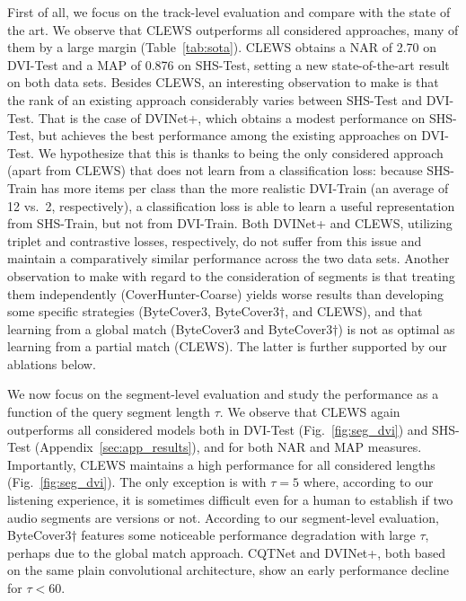 First of all, we focus on the track-level evaluation and compare with the state of the art. We observe that CLEWS outperforms all considered approaches, many of them by a large margin (Table~\ref{tab:sota}). CLEWS obtains a NAR of 2.70 on DVI-Test and a MAP of 0.876 on SHS-Test, setting a new state-of-the-art result on both data sets. Besides CLEWS, an interesting observation to make is that the rank of an existing approach considerably varies between SHS-Test and DVI-Test. That is the case of DVINet+, which obtains a modest performance on SHS-Test, but achieves the best performance among the existing approaches on DVI-Test. We hypothesize that this is thanks to being the only considered approach (apart from CLEWS) that does not learn from a classification loss: because SHS-Train has more items per class than the more realistic DVI-Train (an average of 12 vs.\ 2, respectively), a classification loss is able to learn a useful representation from SHS-Train, but not from DVI-Train. Both DVINet+ and CLEWS, utilizing triplet and contrastive losses, respectively, do not suffer from this issue and maintain a comparatively similar performance across the two data sets. 
Another observation to make with regard to the consideration of segments is that treating them independently (CoverHunter-Coarse) yields worse results than developing some specific strategies (ByteCover3, ByteCover3$\dag$, and CLEWS), and that learning from a global match (ByteCover3 and ByteCover3$\dag$) is not as optimal as learning from a partial match (CLEWS). The latter is further supported by our ablations below.


We now focus on the segment-level evaluation and study the performance as a function of the query segment length $\tau$. We observe that CLEWS again outperforms all considered models both in DVI-Test (Fig.~\ref{fig:seg_dvi}) and SHS-Test (Appendix~\ref{sec:app_results}), and for both NAR and MAP measures. Importantly, CLEWS maintains a high performance for all considered lengths (Fig.~\ref{fig:seg_dvi}). The only exception is with $\tau=5$ where, according to our listening experience, it is sometimes difficult even for a human to establish if two audio segments are versions or not. According to our segment-level evaluation, ByteCover3$\dag$ features some noticeable performance degradation with large $\tau$, perhaps due to the global match approach. CQTNet and DVINet+, both based on the same plain convolutional architecture, show an early performance decline for $\tau<60$.


